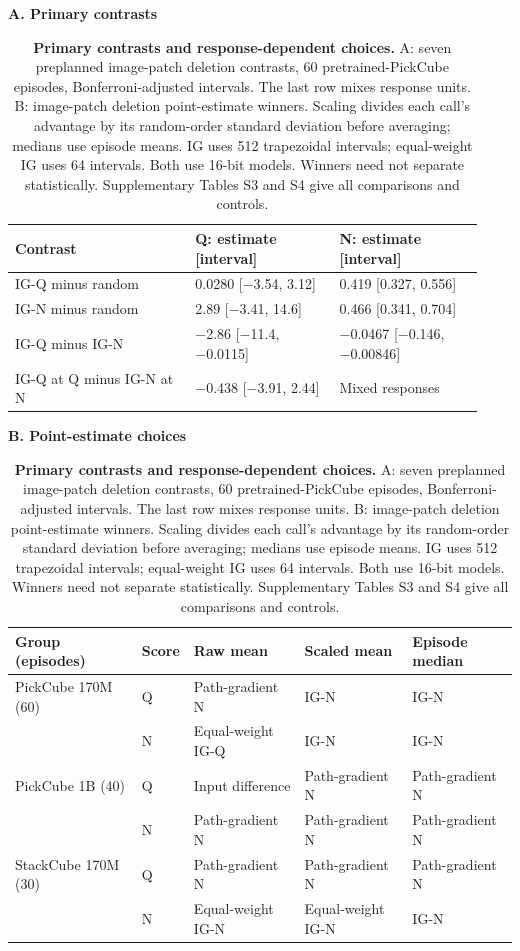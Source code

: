 \begin{table}[htbp]
\centering
\caption{\textbf{Primary contrasts and response-dependent choices.} A: seven preplanned image-patch deletion contrasts, 60 pretrained-PickCube episodes, Bonferroni-adjusted intervals. The last row mixes response units. B: image-patch deletion point-estimate winners. Scaling divides each call's advantage by its random-order standard deviation before averaging; medians use episode means. IG uses 512 trapezoidal intervals; equal-weight IG uses 64 intervals. Both use 16-bit models. Winners need not separate statistically. Supplementary Tables S3 and S4 give all comparisons and controls.}
\label{tab:r1-methods-summary}
\setlength{\tabcolsep}{3pt}
\par\textbf{A. Primary contrasts}\par\smallskip\begin{tabular}{p{0.350\linewidth} p{0.290\linewidth} p{0.290\linewidth}}
\toprule
\textbf{Contrast} & \textbf{Q: estimate [interval]} & \textbf{N: estimate [interval]} \\
\midrule
IG-Q minus random & 0.0280 [−3.54, 3.12] & 0.419 [0.327, 0.556] \\
IG-N minus random & 2.89 [−3.41, 14.6] & 0.466 [0.341, 0.704] \\
IG-Q minus IG-N & −2.86 [−11.4, −0.0115] & −0.0467 [−0.146, −0.00846] \\
IG-Q at Q minus IG-N at N & −0.438 [−3.91, 2.44] & Mixed responses \\
\bottomrule
\end{tabular}


\par\smallskip\textbf{B. Point-estimate choices}\par\smallskip\begin{tabular}{p{.22\linewidth}p{.08\linewidth}p{.21\linewidth}p{.21\linewidth}p{.21\linewidth}}
\toprule \textbf{Group (episodes)} & \textbf{Score} & \textbf{Raw mean} & \textbf{Scaled mean} & \textbf{Episode median} \\ \midrule
PickCube 170M (60) & Q & Path-gradient N & IG-N & IG-N \\
 & N & Equal-weight IG-Q & IG-N & IG-N \\
PickCube 1B (40) & Q & Input difference & Path-gradient N & Path-gradient N \\
 & N & Path-gradient N & Path-gradient N & Path-gradient N \\
StackCube 170M (30) & Q & Path-gradient N & Path-gradient N & Path-gradient N \\
 & N & Equal-weight IG-N & Equal-weight IG-N & IG-N \\
\bottomrule\end{tabular}\end{table}
